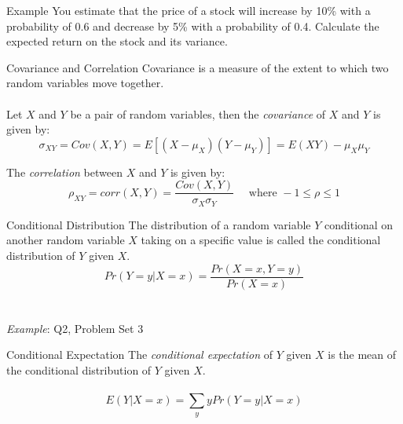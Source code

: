 \documentclass{./../div_teaching_slides}
\begin{document}
\begin{frame}{Example}
You estimate that the price of a stock will increase by 10\% with a probability of 0.6 and decrease by 5\% with a probability of 0.4. Calculate the expected return on the stock and its variance. 
\end{frame}

\begin{frame}{Covariance and Correlation}
Covariance is a measure of the extent to which two random variables move
together. \\~\\
Let $X$ and $Y$ be a pair of random variables, then the \textit{covariance} of $X$ and $Y$ is given by:
$$ \sigma_{XY} = Cov(X,Y) = E[(X-\mu_X)(Y-\mu_Y)] = E(XY)-\mu_X \mu_Y $$ 
\vspace{0.15em}

The \textit{correlation} between $X$ and $Y$ is given by:
$$ \rho_{XY} = corr(X,Y) = \frac{Cov(X,Y)}{\sigma_X \sigma_Y} \quad \text{ where } -1 \leq \rho \leq 1$$
\end{frame}

%

\begin{frame}{Conditional Distribution}
The distribution of a random variable $Y$ conditional on another random variable $X$ taking on a specific value is called the conditional
distribution of $Y$ given $X$.
$$ Pr(Y=y| X=x) = \frac{Pr(X=x, Y=y)}{Pr(X=x)}   $$ \\~\\

\textit{Example}: Q2, Problem Set 3
\end{frame}

\begin{frame}{Conditional Expectation}
The \textit{conditional expectation} of $Y$ given $X$ is the mean of the conditional distribution of $Y$ given $X$. \\~\\
$$ E(Y|X=x) = \sum_{y} y Pr(Y=y | X=x) $$
\end{frame}
\end{document}
